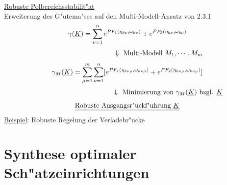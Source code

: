 \documentclass[openany,a4paper,11pt]{book}
\begin{document}
\uline{Robuste Polbereichsstabilit"at}\\
Erweiterung des G"utema"ses auf den Multi-Modell-Ansatz von 2.3.1
\[\gamma(\uline{K})=\sum_{\nu=1}^n e^{PF_1(\eta_{k\nu},\omega_{k\nu})}+e^{PF_2(\eta_{k\nu},\omega_{k\nu})}\]
\[{\color{white}yonglaizhanzishude}\Downarrow \text{ Multi-Modell } M_1,\cdots,M_m\]
\[\gamma_M(\uline{K})=\sum_{\mu=1}^m\sum_{\nu=1}^n[ e^{PF_1(\eta_{k\nu\mu},\omega_{k\nu\mu})}+e^{PF_2(\eta_{k\nu\mu},\omega_{k\nu\mu})}]\]
\[{\color{white}jiushiyonglaizhanzishude} \Downarrow \text{ Minimierung von } \gamma_M(\uline{K}) \text{ bzgl. } \uline{K}\]
\[\uline{\text{Robuste Ausgangsr"uckf"uhrung } \uline{K}}\]
\uline{Beispiel}: Robuste Regelung der Verladebr"ucke

\chapter{Synthese optimaler Sch"atzeinrichtungen}
\end{document}
